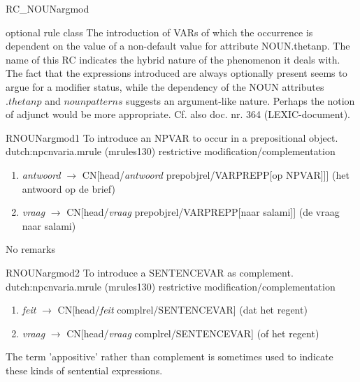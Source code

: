 \begin{mruleclass}{RC\_NOUNargmod}
\begin{classdescr}
\kind optional rule class
\classtask The introduction of VARs of which the occurrence is dependent on the 
value of a non-default value for  attribute NOUN.thetanp.
\classremarks 
The name of this RC indicates the hybrid nature of the phenomenon 
it deals with.
The fact that the expressions introduced are always optionally present seems to 
argue for a modifier status, while the dependency of the NOUN attributes 
$.thetanp$ and $nounpatterns$ suggests an argument-like nature. Perhaps the 
notion of adjunct would be more appropriate. 
Cf. also doc. nr. 364 (LEXIC-document).
\nofilters
\nospeedrules
\noplannedrules
\norulesnotince
\begin{comments}
\end{comments}

\end{classdescr}

\begin{members}

\begin{member}
 RNOUNargmod1
 To introduce an NPVAR to occur in a prepositional object.
\file dutch:npcnvaria.mrule (mrules130)
\semantics restrictive modification/complementation
\example\mbox{}
\begin{enumerate}
  \item 
{\em antwoord} $\rightarrow$ CN[head/{\em antwoord} prepobjrel/VARPREPP[op 
NPVAR]]] (het antwoord op de brief)
  \item
{\em vraag} $\rightarrow$ CN[head/{\em vraag} prepobjrel/VARPREPP[naar salami]]
 (de vraag naar salami)
\end{enumerate}
\remarks No remarks
\end{member}
\begin{member}
 RNOUNargmod2
 To introduce a SENTENCEVAR as complement.
\file dutch:npcnvaria.mrule (mrules130)
\semantics restrictive modification/complementation
\example\mbox{}
\begin{enumerate}
  \item 
{\em feit} $\rightarrow$ CN[head/{\em feit } complrel/SENTENCEVAR] (dat het 
regent)
  \item
{\em vraag} $\rightarrow$ CN[head/{\em vraag} complrel/SENTENCEVAR] (of het 
regent)
\end{enumerate}
\remarks The term 'appositive' rather than complement 
is sometimes used to indicate these kinds of sentential expressions.
\end{member}


\end{members}   
\end{mruleclass}


